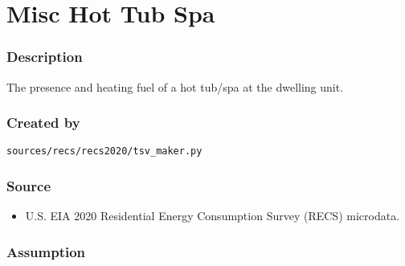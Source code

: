 \section{Misc Hot Tub Spa}\label{misc_hot_tub_spa}

\subsubsection{Description}\label{description-115}

The presence and heating fuel of a hot tub/spa at the dwelling unit.

\subsubsection{Created by}\label{created-by-116}

\texttt{sources/recs/recs2020/tsv\_maker.py}

\subsubsection{Source}\label{source-118}

\begin{itemize}
 
\item
  U.S. EIA 2020 Residential Energy Consumption Survey (RECS) microdata.
\end{itemize}

\subsubsection{Assumption}\label{assumption-70}

